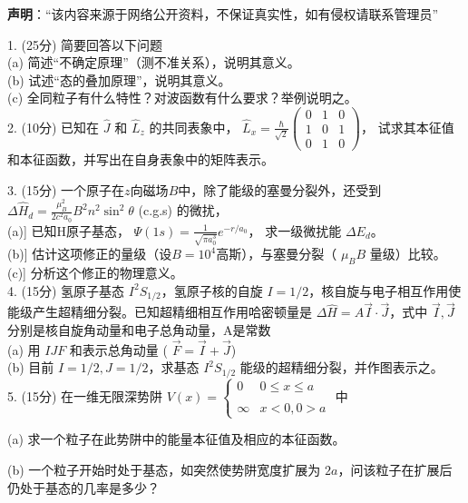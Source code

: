 
\textbf{声明}：“该内容来源于网络公开资料，不保证真实性，如有侵权请联系管理员”

1. (25分) 简要回答以下问题\\
(a) 简述“不确定原理”（测不准关系），说明其意义。\\
(b) 试述“态的叠加原理”，说明其意义。\\
(c) 全同粒子有什么特性？对波函数有什么要求？举例说明之。\\

2. (10分) 已知在 $\hat{J}$ 和 $\hat{L}_z$ 的共同表象中， $\hat{L}_x = \frac{\hbar}{\sqrt{2}} \begin{pmatrix} 
0 & 1 & 0 \\
1 & 0 & 1 \\
0 & 1 & 0 
\end{pmatrix}$， 试求其本征值和本征函数，并写出在自身表象中的矩阵表示。

3. (15分) 一个原子在$z$向磁场$B$中，除了能级的塞曼分裂外，还受到 $\Delta \hat{H}_d = \frac{\mu_B^2}{2c^2a_0} B^2 n^2 \sin^2 \theta$ (c.g.s) 的微扰，\\
(a)] 已知H原子基态， $\Psi (1s) = \frac{1}{\sqrt{\pi a_0^3}} e^{-r/a_0}$， 求一级微扰能 $ \Delta E_d$。\\
(b)] 估计这项修正的量级（设$B=10^4$高斯），与塞曼分裂（ $\mu_B B$ 量级）比较。\\
(c)] 分析这个修正的物理意义。\\

4. (15分) 氢原子基态 $I^2S_{1/2}$，氢原子核的自旋 $I=1/2$，核自旋与电子相互作用使能级产生超精细分裂。已知超精细相互作用哈密顿量是 $\Delta\hat H = A \vec{I} \cdot \vec{J}$，式中 $\vec{I}, \vec{J}$ 分别是核自旋角动量和电子总角动量，A是常数\\
(a) 用 $I J F$ 和表示总角动量 ( $\vec{F} = \vec{I} + \vec{J}$)\\
(b) 目前 $I = 1/2, J = 1/2$，求基态 $I^2S_{1/2}$ 能级的超精细分裂，并作图表示之。\\

5. (15分) 在一维无限深势阱 $V(x) = 
\begin{cases} 
0 & 0 \leq x \leq a \\\\
\infty & x < 0, 0 > a 
\end{cases}$
中

(a) 求一个粒子在此势阱中的能量本征值及相应的本征函数。

(b) 一个粒子开始时处于基态，如突然使势阱宽度扩展为 $2a$，问该粒子在扩展后仍处于基态的几率是多少？

